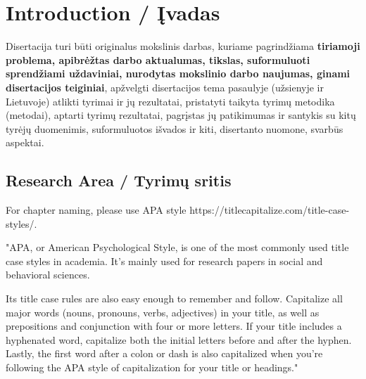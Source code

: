     

\chapter*{Introduction / Įvadas}
\label{cha:intro}

Disertacija turi būti originalus mokslinis darbas, kuriame pagrindžiama \textbf{tiriamoji problema, apibrėžtas darbo aktualumas, tikslas, suformuluoti sprendžiami uždaviniai, nurodytas mokslinio darbo naujumas, ginami disertacijos teiginiai}, apžvelgti disertacijos tema pasaulyje (užsienyje ir Lietuvoje) atlikti tyrimai ir jų rezultatai, pristatyti taikyta tyrimų metodika (metodai), aptarti tyrimų rezultatai, pagrįstas jų patikimumas ir santykis su kitų tyrėjų duomenimis, suformuluotos išvados ir kiti, disertanto nuomone, svarbūs aspektai.


\section*{Research Area / Tyrimų sritis}

For chapter naming, please use APA style https://titlecapitalize.com/title-case-styles/.

    "APA, or American Psychological Style, is one of the most commonly used title case styles in academia. It’s mainly used for research papers in social and behavioral sciences. 
        
    Its title case rules are also easy enough to remember and follow. Capitalize all major words (nouns, pronouns, verbs, adjectives) in your title, as well as prepositions and conjunction with four or more letters. If your title includes a hyphenated word, capitalize both the initial letters before and after the hyphen. Lastly, the first word after a colon or dash is also capitalized when you’re following the APA style of capitalization for your title or headings."

